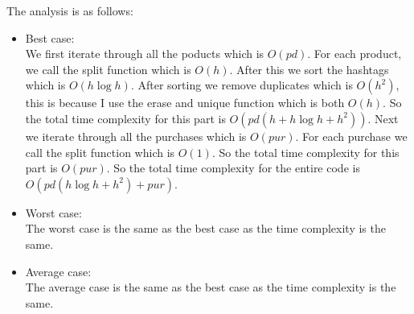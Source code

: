 \documentclass[12pt]{article}
\begin{document}
The analysis is as follows:
\begin{itemize}
    \item Best case: \\ We first iterate through all the poducts which is $O(pd)$. For each product, we call the split function which is $O(h)$. After this we sort the hashtags which is $O(h\log h)$. After sorting we remove duplicates which is $O(h^2)$, this is because I use the erase and unique function which is both $O(h)$. So the total time complexity for this part is $O(pd(h + h\log h + h^2))$. Next we iterate through all the purchases which is $O(pur)$. For each purchase we call the split function which is $O(1)$. So the total time complexity for this part is $O(pur)$. So the total time complexity for the entire code is $O(pd(h\log h + h^2) + pur)$.
    \item Worst case: \\ The worst case is the same as the best case as the time complexity is the same.
    \item Average case: \\ The average case is the same as the best case as the time complexity is the same.
\end{itemize}
\end{document}
